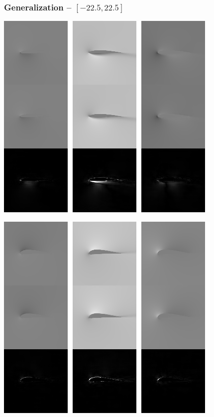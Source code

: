 \clearpage

\begin{frame}
    \frametitle{Generalization -- $[-22.5, 22.5]$}
    \vspace*{.1cm}
\begin{multicols}{2}
	
	\includegraphics[width=.9\columnwidth, height=.6\textheight]{./Ressourcen/Praesentation/Bilder/TransferEval/std/0065_bw.png}%
    \vfill\columnbreak
    
    \includegraphics[width=.9\columnwidth, height=.6\textheight]{./Ressourcen/Praesentation/Bilder/TransferEval/std/0084_bw.png}%
\end{multicols}
    
\end{frame}
\clearpage

